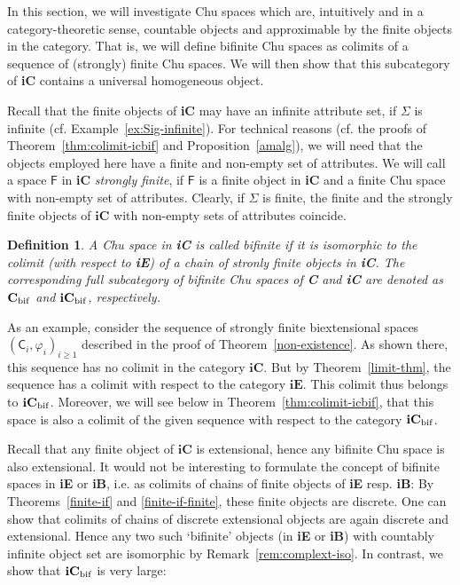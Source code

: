 \documentclass{LMCS}
\newtheorem{defn}{Definition}[section]
\begin{document}
\noindent In this section, we will investigate Chu spaces which are,
intuitively and in a category-theoretic sense, countable objects and
approximable by the finite objects in the category. That is, we will
define bifinite Chu spaces as colimits of a sequence of (strongly)
finite Chu spaces. We will then show that this subcategory of
\textbf{iC} contains a universal homogeneous object.


Recall that the finite objects of \textbf{iC} may have an infinite
attribute set, if $\Sigma$ is infinite (cf. Example~\ref{ex:Sig-infinite}). 
For technical reasons (cf. the proofs
of Theorem~\ref{thm:colimit-icbif} and Proposition~\ref{amalg}),
we will need that the objects employed here have a finite and
non-empty set of attributes. We will call a space $\mathsf{F}$ in
\textbf{iC} \emph{strongly finite}, if $\mathsf{F}$ is a finite object
in \textbf{iC} and a finite Chu space with non-empty set of
attributes. Clearly, if $\Sigma$ is finite, the finite and the
strongly finite objects of $\mathbf{iC}$ with non-empty sets of
attributes coincide. 


\begin{defn}
  A Chu space in {\bf iC} is called bifinite if it is isomorphic to
  the colimit (with respect to {\bf iE}) of a chain of stronly finite
  objects in {\bf iC}.  The corresponding full subcategory of bifinite
  Chu spaces of {\bf C} and {\bf iC} are denoted as ${\bf C}_{\rm
    bif}$ and ${\bf iC}_{\rm bif}$, respectively. 
\end{defn}

As an example, consider the sequence of strongly finite biextensional
spaces $(\mathsf{C}_i,\varphi_i)_{i \geq 1}$ described in the proof of
Theorem~\ref{non-existence}.  As shown there, this sequence has no
colimit in the category $\mathbf{iC}$.  But by
Theorem~\ref{limit-thm}, the sequence has a colimit with respect to
the category $\mathbf{iE}$. This colimit thus belongs to
$\mathbf{iC}_{\rm bif}$.  Moreover, we will see below in
Theorem~\ref{thm:colimit-icbif}, that this space is also a colimit
of the given sequence with respect to the category $\mathbf{iC}_{\rm
  bif}$. 

Recall that any finite object of $\mathbf{iC}$ is extensional, hence
any bifinite Chu space is also extensional. It would not be
interesting to formulate the concept of bifinite spaces in \textbf{iE}
or \textbf{iB}, i.e. as colimits of chains of finite objects of
\textbf{iE} resp. \textbf{iB}: By Theorems~\ref{finite-if} and
\ref{finite-if-finite}, these finite objects are discrete. One can show that
colimits of chains of discrete extensional objects are again discrete
and extensional. Hence any two such `bifinite' objects (in \textbf{iE}
or \textbf{iB}) with countably infinite object set are isomorphic by
Remark~\ref{rem:complext-iso}. In contrast, we show that
$\mathbf{iC}_{\rm bif}$ is very large:
\end{document}
